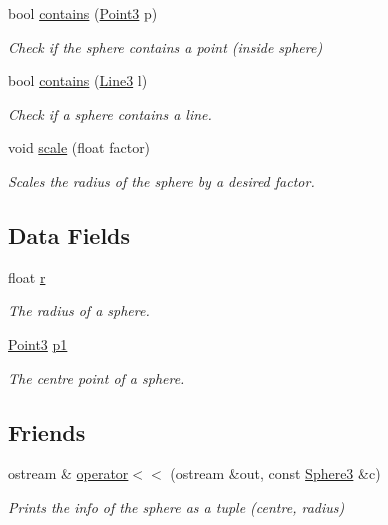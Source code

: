 \begin{DoxyCompactItemize}
bool \mbox{\hyperlink{class_sphere3_a1fa38a829efe96d578cf08a99849a200}{contains}} (\mbox{\hyperlink{class_point3}{Point3}} p)
\begin{DoxyCompactList}\small\item\em Check if the sphere contains a point (inside sphere) \end{DoxyCompactList}\item 
bool \mbox{\hyperlink{class_sphere3_aa03cfcb0166fa5a928b07e1ef1c2a9b5}{contains}} (\mbox{\hyperlink{class_line3}{Line3}} l)
\begin{DoxyCompactList}\small\item\em Check if a sphere contains a line. \end{DoxyCompactList}\item 
void \mbox{\hyperlink{class_sphere3_a1662d09d54495302fd96dd888961a706}{scale}} (float factor)
\begin{DoxyCompactList}\small\item\em Scales the radius of the sphere by a desired factor. \end{DoxyCompactList}\end{DoxyCompactItemize}
\subsection*{Data Fields}
\begin{DoxyCompactItemize}
\item 
float \mbox{\hyperlink{class_sphere3_a9d708aaaae110ad37288b3471293fd01}{r}}
\begin{DoxyCompactList}\small\item\em The radius of a sphere. \end{DoxyCompactList}\item 
\mbox{\hyperlink{class_point3}{Point3}} \mbox{\hyperlink{class_sphere3_a87caaa2b273128ff6b76d4c4dc84c785}{p1}}
\begin{DoxyCompactList}\small\item\em The centre point of a sphere. \end{DoxyCompactList}\end{DoxyCompactItemize}
\subsection*{Friends}
\begin{DoxyCompactItemize}
\item 
ostream \& \mbox{\hyperlink{class_sphere3_aa9adc2f852a9caf9692f1718f8d3a5c9}{operator$<$$<$}} (ostream \&out, const \mbox{\hyperlink{class_sphere3}{Sphere3}} \&c)
\begin{DoxyCompactList}\small\item\em Prints the info of the sphere as a tuple (centre, radius) \end{DoxyCompactList}\end{DoxyCompactItemize}


